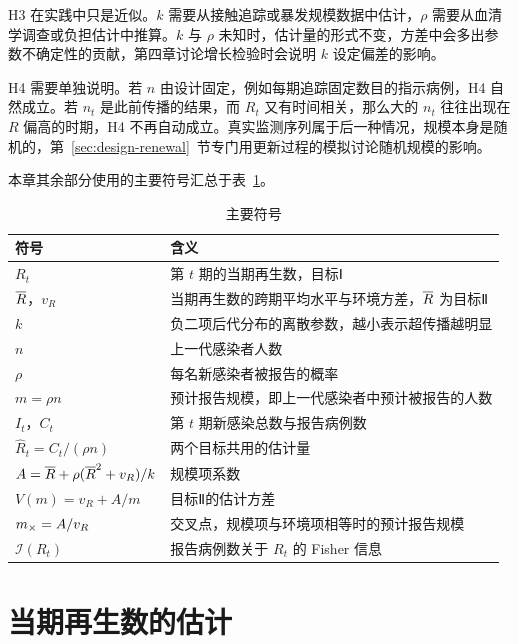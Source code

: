 H3 在实践中只是近似。$k$ 需要从接触追踪或暴发规模数据中估计\citep{lloydsmith2005superspreading, endo2020estimating}，$\rho$ 需要从血清学调查或负担估计中推算\citep{reed2009estimates, tokars2018seasonal}。$k$ 与 $\rho$ 未知时，估计量的形式不变，方差中会多出参数不确定性的贡献，第四章讨论增长检验时会说明 $k$ 设定偏差的影响。

H4 需要单独说明。若 $n$ 由设计固定，例如每期追踪固定数目的指示病例，H4 自然成立。若 $n_t$ 是此前传播的结果，而 $R_t$ 又有时间相关，那么大的 $n_t$ 往往出现在 $R$ 偏高的时期，H4 不再自动成立。真实监测序列属于后一种情况，规模本身是随机的，第~\ref{sec:design-renewal}~节专门用更新过程的模拟讨论随机规模的影响。

本章其余部分使用的主要符号汇总于表~\ref{tab:symbols}。

\begin{table}[!tbp]
  \centering
  \caption{主要符号}
  \label{tab:symbols}
  \small
  \begin{tabularx}{\textwidth}{@{}lX@{}}
    \toprule
    符号 & 含义 \\
    \midrule
    $R_t$ & 第 $t$ 期的当期再生数，目标Ⅰ \\
    $\overline{R}$，$v_R$ & 当期再生数的跨期平均水平与环境方差，$\overline{R}$ 为目标Ⅱ \\
    $k$ & 负二项后代分布的离散参数，越小表示超传播越明显 \\
    $n$ & 上一代感染者人数 \\
    $\rho$ & 每名新感染者被报告的概率 \\
    $m=\rho n$ & 预计报告规模，即上一代感染者中预计被报告的人数 \\
    $I_t$，$C_t$ & 第 $t$ 期新感染总数与报告病例数 \\
    $\widehat R_t=C_t/(\rho n)$ & 两个目标共用的估计量 \\
    $A=\overline{R}+\rho(\overline{R}^2+v_R)/k$ & 规模项系数 \\
    $V(m)=v_R+A/m$ & 目标Ⅱ的估计方差 \\
    $m_{\times}=A/v_R$ & 交叉点，规模项与环境项相等时的预计报告规模 \\
    $\mathcal{I}(R_t)$ & 报告病例数关于 $R_t$ 的 Fisher 信息 \\
    \bottomrule
  \end{tabularx}
\end{table}

\section{当期再生数的估计}
\label{sec:model-current}

